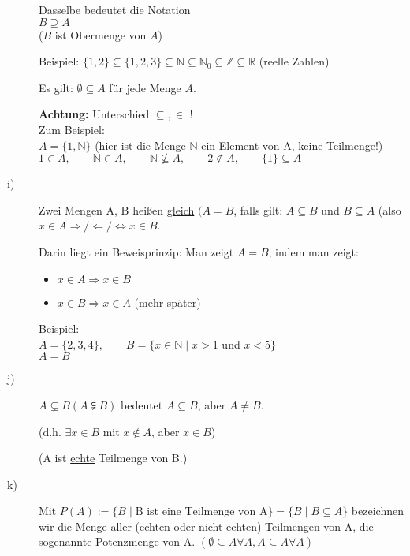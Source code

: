\documentclass[a4paper, 12pt, twoside] {article}
\begin{document}
\begin{description}
	Dasselbe bedeutet die Notation\\
	$B \supseteq A$ \\
	($B$ ist Obermenge von $A$)
	
	Beispiel: $\{1,2\} \subseteq \{1,2,3\} \subseteq \mathbb{N} \subseteq \mathbb{N}_0 \subseteq \mathbb{Z} \subseteq \mathbb{R}$ (reelle Zahlen)
	
	Es gilt: $\emptyset \subseteq A$ für jede Menge $A$.

	\textbf{Achtung: } Unterschied $\subseteq, \in$ !\\
	Zum Beispiel: \\
	$A = \{1, \mathbb{N}\}$ (hier ist die Menge $\mathbb{N}$ ein Element von A, keine Teilmenge!)\\
	$1 \in A, \qquad \mathbb{N} \in A, \qquad \mathbb{N} \nsubseteq A, \qquad 2 \notin A, \qquad \{1\} \subseteq A$


\item[i)]
	Zwei Mengen A, B heißen \underline{gleich} $(A = B$, falls gilt: $A \subseteq B$ und $B \subseteq A$
	(also $x \in A \Rightarrow / \Leftarrow / \Leftrightarrow x \in B$.


	Darin liegt ein Beweisprinzip: Man zeigt $A = B$, indem man zeigt:
	\begin{itemize}
	\item $x \in A \Rightarrow x \in B$
	\item $x \in B \Rightarrow x \in A$ (mehr später)
	\end{itemize}

	Beispiel: \\
	$A = \{2, 3, 4\}, \qquad B = \{ x \in \mathbb{N} \mid x > 1$ und $x < 5\}$ \\
	$A = B$

\item[j)]
	$A \subsetneq B (A \subsetneqq B)$ bedeutet $A \subseteq B$, aber $A \neq B$.

	(d.h. $\exists x \in B$ mit $x \notin A$, aber $x \in B$) %

	(A ist \underline{echte} Teilmenge von B.)


\item[k)]
	Mit $P(A) := \{ B \mid \text{B ist eine Teilmenge von A}\} = \{B \mid B \subseteq A\}$
	bezeichnen wir die Menge aller (echten oder nicht echten) Teilmengen von A, die sogenannte \underline{Potenzmenge von A}.
	$(\emptyset \subseteq A \forall A, A \subseteq A \forall A)$


\end{description}
\end{document}
